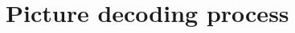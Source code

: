 
\section{Picture decoding process}

\begin{comment}
\clearpage
\section{Inverse discrete wavelet transform}
\end{comment}

\begin{comment}
\clearpage
\section{Motion compensation}
\end{comment}
